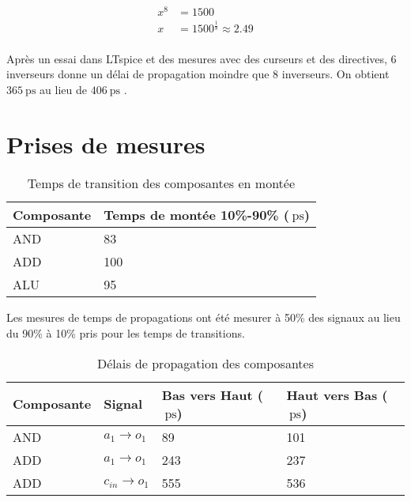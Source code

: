 \documentclass[a11paper]{article}
\newcommand{\quicktab}[4]{
  \begin{table}[H]
    \centering
    \caption{#1}
    \label{tab:#2}
    \begin{tabular}{#3}
      #4
    \end{tabular}
  \end{table}
}
\begin{document}
\begin{align}
  x^8 &= 1500 \\
  x   &= 1500^{\frac{1}{8}} \approx 2.49 \\
\end{align}

Après un essai dans LTspice et des mesures avec des curseurs et des directives,
6 inverseurs donne un délai de propagation moindre que 8 inverseurs.
On obtient $\SI{365}{\pico\s}$ au lieu de $\SI{406}{\pico\s}$ .

\section{Prises de mesures}

\quicktab{Temps de transition des composantes en montée}{ttLH-Sortie}{ll}{
\toprule
Composante & Temps de montée 10\%-90\% ($\SI{}{\pico\s}$) \\
\midrule
AND & 83 \\
ADD & 100 \\ %
ALU & 95 \\
\bottomrule
}

Les mesures de temps de propagations ont été mesurer à 50\% des signaux au lieu du 90\% à 10\% pris pour les temps de transitions.

\quicktab{Délais de propagation des composantes}{propagation}{llll}{
\toprule
Composante & Signal & Bas vers Haut ($\SI{}{\pico\s}$) & Haut vers Bas ($\SI{}{\pico\s}$) \\
\midrule
AND & $a_1 \rightarrow o_1$ & 89 & 101 \\
ADD & $a_1 \rightarrow o_1$ & 243 & 237 \\
ADD & $c_{in} \rightarrow o_1$ & 555 & 536 \\
\bottomrule
}




\end{document}

